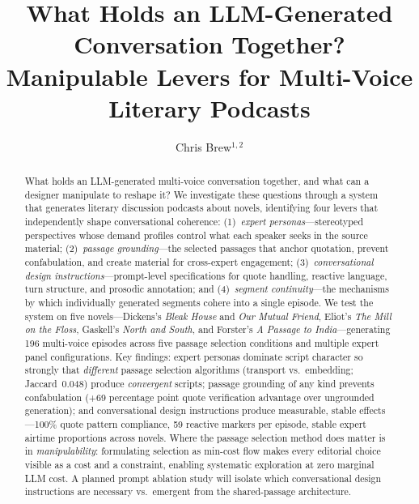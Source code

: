 \documentclass[final]{clv2025}
\begin{document}
\title{What Holds an LLM-Generated Conversation Together?\\
Manipulable Levers for Multi-Voice Literary Podcasts}

\author{Chris Brew$^{1,2}$}


\maketitle

\begin{abstract}
What holds an LLM-generated multi-voice conversation together, and what
can a designer manipulate to reshape it?  We investigate these questions
through a system that generates literary discussion podcasts about
novels, identifying four levers that independently shape conversational
coherence: (1)~\emph{expert personas}---stereotyped perspectives whose
demand profiles control what each speaker seeks in the source material;
(2)~\emph{passage grounding}---the selected passages that anchor
quotation, prevent confabulation, and create material for cross-expert
engagement; (3)~\emph{conversational design instructions}---prompt-level
specifications for quote handling, reactive language, turn structure, and
prosodic annotation; and (4)~\emph{segment continuity}---the mechanisms
by which individually generated segments cohere into a single episode.
We test the system on five novels---Dickens's \textit{Bleak House} and
\textit{Our Mutual Friend}, Eliot's \textit{The Mill on the Floss},
Gaskell's \textit{North and South}, and Forster's \textit{A Passage to
India}---generating 196 multi-voice episodes across five passage
selection conditions and multiple expert panel configurations.  Key
findings: expert personas dominate script character so strongly that
\emph{different} passage selection algorithms (transport vs.\
embedding; Jaccard~0.048) produce \emph{convergent} scripts; passage
grounding of any kind prevents confabulation (+69 percentage point
quote verification advantage over ungrounded generation); and
conversational design instructions produce measurable, stable
effects---100\% quote pattern compliance, 59 reactive markers per
episode, stable expert airtime proportions across novels.  Where the
passage selection method does matter is in \emph{manipulability}:
formulating selection as min-cost flow makes every editorial choice
visible as a cost and a constraint, enabling systematic exploration at
zero marginal LLM cost.  A planned prompt ablation study will isolate
which conversational design instructions are necessary vs.\ emergent
from the shared-passage architecture.
\end{abstract}
\end{document}
